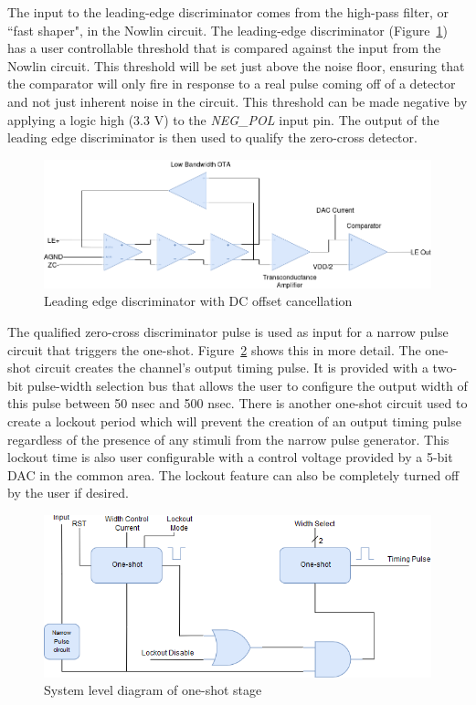 \documentclass[12pt,oneside,final]{siuethesis}
\theoremstyle{definition}
\begin{document}
\par The input to the leading-edge discriminator comes from the high-pass filter, or ``fast shaper", in the Nowlin circuit. The leading-edge discriminator (Figure~\ref{fig:led}) has a user controllable threshold that is compared against the input from the Nowlin circuit. This threshold will be set just above the noise floor, ensuring that the comparator will only fire in response to a real pulse coming off of a detector and not just inherent noise in the circuit. This threshold can be made negative by applying a logic high (3.3 V) to the \emph{NEG\_POL} input pin. The output of the leading edge discriminator is then used to qualify the zero-cross detector.

\begin{figure}[htbp!]
\centering
\includegraphics[scale=.45,keepaspectratio=true]{./ch2_figures/led.png} 
\caption{Leading edge discriminator with DC offset cancellation}
\label{fig:led}
\end{figure}

\par The qualified zero-cross discriminator pulse is used as input for a narrow pulse circuit that triggers the one-shot. Figure~\ref{fig:oneshot} shows this in more detail. The one-shot circuit creates the channel's output timing pulse. It is provided with a two-bit pulse-width selection bus that allows the user to configure the output width of this pulse between 50 nsec and 500 nsec. There is another one-shot circuit used to create a lockout period which will prevent the creation of an output timing pulse regardless of the presence of any stimuli from the narrow pulse generator. This lockout time is also user configurable with a control voltage provided by a 5-bit DAC in the common area. The lockout feature can also be completely turned off by the user if desired.\\

\begin{figure}[h!]
\centering
\includegraphics[scale=.65,keepaspectratio=true]{./ch2_figures/oneshot.png} 
\caption{System level diagram of one-shot stage}
\label{fig:oneshot}
\end{figure}
\end{document}
